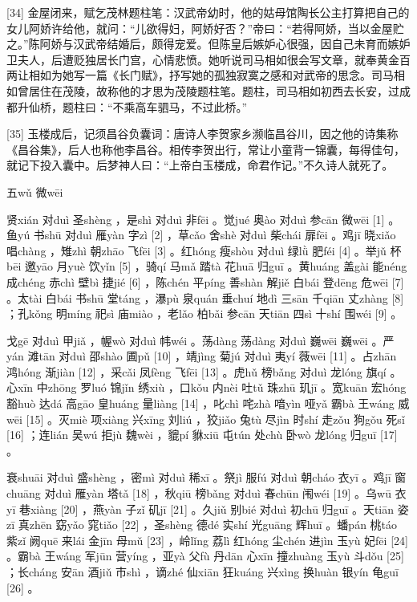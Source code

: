 \documentclass[12pt,UTF8]{ctexbook}
\begin{document}
[34] 金屋闭来，赋乞茂林题柱笔：汉武帝幼时，他的姑母馆陶长公主打算把自己的女儿阿娇许给他，就问：“儿欲得妇，阿娇好否？”帝曰：“若得阿娇，当以金屋贮之。”陈阿娇与汉武帝结婚后，颇得宠爱。但陈皇后嫉妒心很强，因自己未育而嫉妒卫夫人，后遭贬独居长门宫，心情悲愤。她听说司马相如很会写文章，就奉黄金百两让相如为她写一篇《长门赋》，抒写她的孤独寂寞之感和对武帝的思念。司马相如曾居住在茂陵，故称他的才思为茂陵题柱笔。题柱，司马相如初西去长安，过成都升仙桥，题柱曰：“不乘高车驷马，不过此桥。”

[35] 玉楼成后，记须昌谷负囊词：唐诗人李贺家乡濒临昌谷川，因之他的诗集称《昌谷集》，后人也称他李昌谷。相传李贺出行，常让小童背一锦囊，每得佳句，就记下投入囊中。后梦神人曰：“上帝白玉楼成，命君作记。”不久诗人就死了。





五wǔ 微wēi


贤xián 对duì 圣shèng ，是shì 对duì 非fēi 。觉jué 奥ào 对duì 参cān 微wēi [1] 。鱼yú 书shū 对duì 雁yàn 字zì [2] ，草cǎo 舍shè 对duì 柴chái 扉fēi 。鸡jī 晓xiǎo 唱chàng ，雉zhì 朝zhāo 飞fēi [3] 。红hóng 瘦shòu 对duì 绿lǜ 肥féi [4] 。举jǔ 杯bēi 邀yāo 月yuè 饮yǐn [5] ，骑qí 马mǎ 踏tà 花huā 归guī 。黄huáng 盖gài 能néng 成chéng 赤chì 壁bì 捷jié [6] ，陈chén 平píng 善shàn 解jiě 白bái 登dēng 危wēi [7] 。太tài 白bái 书shū 堂táng ，瀑pù 泉quán 垂chuí 地dì 三sān 千qiān 丈zhàng [8] ；孔kǒng 明míng 祀sì 庙miào ，老lǎo 柏bǎi 参cān 天tiān 四sì 十shí 围wéi [9] 。

戈gē 对duì 甲jiǎ ，幄wò 对duì 帏wéi 。荡dàng 荡dàng 对duì 巍wēi 巍wēi 。严yán 滩tān 对duì 邵shào 圃pǔ [10] ，靖jìng 菊jú 对duì 夷yí 薇wēi [11] 。占zhān 鸿hóng 渐jiàn [12] ，采cǎi 凤fèng 飞fēi [13] 。虎hǔ 榜bǎng 对duì 龙lóng 旗qí 。心xīn 中zhōng 罗luó 锦jǐn 绣xiù ，口kǒu 内nèi 吐tǔ 珠zhū 玑jī 。宽kuān 宏hóng 豁huò 达dá 高gāo 皇huáng 量liàng [14] ，叱chì 咤zhà 喑yìn 哑yǎ 霸bà 王wáng 威wēi [15] 。灭miè 项xiàng 兴xīng 刘liú ，狡jiǎo 兔tù 尽jìn 时shí 走zǒu 狗gǒu 死sǐ [16] ；连lián 吴wú 拒jù 魏wèi ，貔pí 貅xiū 屯tún 处chù 卧wò 龙lóng 归guī [17] 。

衰shuāi 对duì 盛shèng ，密mì 对duì 稀xī 。祭jì 服fú 对duì 朝cháo 衣yī 。鸡jī 窗chuāng 对duì 雁yàn 塔tǎ [18] ，秋qiū 榜bǎng 对duì 春chūn 闱wéi [19] 。乌wū 衣yī 巷xiàng [20] ，燕yàn 子zǐ 矶jī [21] 。久jiǔ 别bié 对duì 初chū 归guī 。天tiān 姿zī 真zhēn 窈yǎo 窕tiǎo [22] ，圣shèng 德dé 实shí 光guāng 辉huī 。蟠pán 桃táo 紫zǐ 阙quē 来lái 金jīn 母mǔ [23] ，岭lǐng 荔lì 红hóng 尘chén 进jìn 玉yù 妃fēi [24] 。霸bà 王wáng 军jūn 营yíng ，亚yà 父fù 丹dān 心xīn 撞zhuàng 玉yù 斗dǒu [25] ；长cháng 安ān 酒jiǔ 市shì ，谪zhé 仙xiān 狂kuáng 兴xìng 换huàn 银yín 龟guī [26] 。
\end{document}
